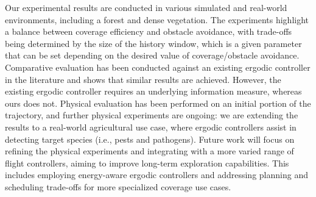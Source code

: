 \documentclass[letterpaper, 10 pt, conference, twoside]{IEEEtran}
\theoremstyle{definition}
\begin{document}
Our experimental results are conducted in various simulated and real-world environments, including a forest and dense vegetation. The experiments highlight a balance between coverage efficiency and obstacle avoidance, with trade-offs being determined by the size of the history window, which is a given parameter that can be set depending on the desired value of coverage/obstacle avoidance. Comparative evaluation has been conducted against an existing ergodic controller in the literature and shows that similar results are achieved. However, the existing ergodic controller requires an underlying information measure, whereas ours does not. Physical evaluation has been performed on an initial portion of the trajectory, and further physical experiments are ongoing: we are extending the results to a real-world agricultural use case, where ergodic controllers assist in detecting target species (i.e., pests and pathogens). Future work will focus on refining the physical experiments and integrating with a more varied range of flight controllers, aiming to improve long-term exploration capabilities. This includes employing energy-aware ergodic controllers %
and addressing planning and scheduling trade-offs for more specialized coverage use cases.%


{\small
 

}
\end{document}
